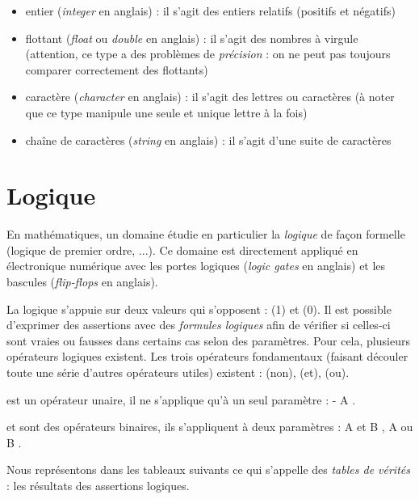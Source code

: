\documentclass[11pt,a4paper]{article}
\begin{document}
\begin{itemize}
\item entier (\textit{integer} en anglais) : il s'agit des entiers relatifs (positifs et négatifs)
\item flottant (\textit{float} ou \textit{double} en anglais) : il s'agit des nombres à virgule (attention, ce type a des problèmes de \textit{précision} : on ne peut pas toujours comparer correctement des flottants)
\item caractère (\textit{character} en anglais) : il s'agit des lettres ou caractères (à noter que ce type manipule une seule et unique lettre à la fois)
\item chaîne de caractères (\textit{string} en anglais) : il s'agit d'une suite de caractères
\end{itemize}

\bigskip

\newpage


\section{Logique}

\bigskip

En mathématiques, un domaine étudie en particulier la \textit{logique} de façon formelle (logique de premier ordre, ...).
Ce domaine est directement appliqué en électronique numérique avec les portes logiques (\textit{logic gates} en anglais) et les bascules (\textit{flip-flops} en anglais).

\medskip

La logique s'appuie sur deux valeurs qui s'opposent :  (1) et  (0).
Il est possible d'exprimer des assertions avec des \textit{formules logiques} afin de vérifier si celles-ci sont vraies ou fausses dans certains cas selon des paramètres.
Pour cela, plusieurs opérateurs logiques existent.
Les trois opérateurs fondamentaux (faisant découler toute une série d'autres opérateurs utiles) existent :  (non),  (et),  (ou).

\medskip

 est un opérateur unaire, il ne s'applique qu'à un seul paramètre : \og - A \fg{}.

 et  sont des opérateurs binaires, ils s'appliquent à deux paramètres : \og A et B \fg{}, \og A ou B \fg{}.

Nous représentons dans les tableaux suivants ce qui s'appelle des \textit{tables de vérités} : les résultats des assertions logiques.
\end{document}
